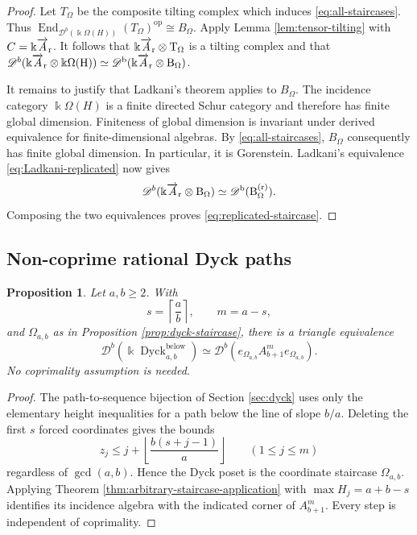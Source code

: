 \documentclass[12pt,a4paper,english,reqno]{amsart}
\theoremstyle{plain}
\newtheorem{proposition}[theorem]{Proposition}
\theoremstyle{definition}
\newcommand{\kk}{\Bbbk}
\newcommand{\End}{\operatorname{End}}
\newcommand{\Dyck}{\operatorname{Dyck}}
\newcommand{\op}{\mathrm{op}}
\newcommand{\Db}[1]{{\mathscr D}^b(#1)}
\newcommand{\ovr}{\rm \overrightarrow}
\begin{document}
\begin{proof}
Let $T_\Omega$ be the composite tilting complex which induces
\eqref{eq:all-staircases}.  Thus $\End_{\Db{\kk\Omega(H)}}(T_\Omega)^{\op}
 \cong B_\Omega$.
Apply Lemma \ref{lem:tensor-tilting} with
$C=\kk\ovr A_r$.  It follows that
$\kk\ovr A_r\otimes T_\Omega$ is a tilting complex and that $\Db{\kk\ovr A_r\otimes\kk\Omega(H)}
 \simeq
 \Db{\kk\ovr A_r\otimes B_\Omega}$.

It remains to justify that Ladkani's theorem applies to $B_\Omega$.
The incidence category $\kk\Omega(H)$ is a finite directed Schur
category and therefore has finite global dimension.  Finiteness of global
dimension is invariant under derived equivalence for finite-dimensional
algebras.  By \eqref{eq:all-staircases}, $B_\Omega$ consequently has
finite global dimension.  In particular, it is Gorenstein.
Ladkani's equivalence \eqref{eq:Ladkani-replicated} now gives
\[
 \Db{\kk\ovr A_r\otimes B_\Omega}
 \simeq \Db{B_\Omega^{(r)}}.
\]
Composing the two equivalences proves
\eqref{eq:replicated-staircase}.
\end{proof}

\subsection{Non-coprime rational Dyck paths}

\begin{proposition}
\label{prop:noncoprime-application}
Let $a,b\geq2$.  With
\[
 s=\left\lceil\frac ab\right\rceil,\qquad m=a-s,
\]
and $\Omega_{a,b}$ as in Proposition \ref{prop:dyck-staircase}, there is a triangle
equivalence
\begin{equation}
 \Db{\kk\Dyck^{\mathrm{below}}_{a,b}}
 \simeq
 \Db{e_{\Omega_{a,b}}A_{b+1}^{m}e_{\Omega_{a,b}}}.
\label{eq:noncoprime-corner}
\end{equation}
No coprimality assumption is needed.
\end{proposition}

\begin{proof}
The path-to-sequence bijection of Section \ref{sec:dyck} uses only the elementary
height inequalities for a path below the line of slope $b/a$.  Deleting
the first $s$ forced coordinates gives the bounds
\[
 z_j\leq
 j+\left\lfloor\frac{b(s+j-1)}a\right\rfloor
 \qquad(1\leq j\leq m)
\]
regardless of $\gcd(a,b)$.  Hence the Dyck poset is the coordinate
staircase $\Omega_{a,b}$.  Applying
Theorem \ref{thm:arbitrary-staircase-application} with
$\max H_j=a+b-s$ identifies its incidence algebra with the indicated
corner of $A_{b+1}^{m}$.  Every step is independent of coprimality.
\end{proof}
\end{document}
